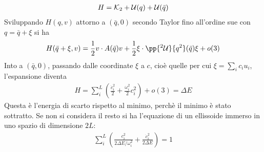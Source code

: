 \documentclass[Main.tex]{subfiles}
\begin{document}
\begin{gather}
	H= \mathcal{K}_2 + \mathcal{U}(q) + \mathcal{U}( \bar q)
\end{gather}
Sviluppando $H(q,v)$ attorno a $(\bar q , 0)$ secondo Taylor fino all'ordine sue con $q= \bar q + \xi$ si ha 
\begin{gather}
	H( \bar 	 q+ \xi, v) = \frac{1}{2} v \cdot A ( \bar q )  v + \frac{1}{2} \xi \cdot \pp{^2 \U}{q^2} (\bar q) \xi +o(3)
\end{gather}
Into a $(\bar q,0)$, passando dalle coordinate $\xi$ a $c$, cioè quelle per cui $\xi = \sum_i c_i u_i$, l'espansione diventa
\begin{gather}
	H= \sum_i^L \left( \frac{\dot c_i^2}{2} + \frac{\omega_i^2}{2} c_i^2 \right) + o(3)= \Delta E
\end{gather}
Questa è l'energia di scarto rispetto al minimo, perchè il minimo è stato sottratto. Se non si considera il resto si ha l'equazione di un ellissoide immerso in uno spazio di dimensione $2L$:
\begin{gather}
	 \sum_i^L \left( \frac{c_i^2}{2 \Delta E /\omega_i^2} + \frac{\dot c_i^2}{2 \Delta E}  \right) =1
\end{gather}



\newpage
\end{document}
